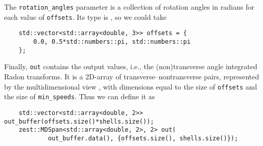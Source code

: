 \documentclass{article}
\begin{document}
The \texttt{rotation_angles} parameter is a collection of rotation angles in radians for each value of \texttt{offsets}. Its type is , so we could take
\begin{verbatim}
    std::vector<std::array<double, 3>> offsets = {
        0.0, 0.5*std::numbers::pi, std::numbers::pi
    };
\end{verbatim}

Finally, \texttt{out} contains the output values, i.e., the (non)transverse angle integrated Radon transforms. It is a 2D-array of transverse--nontransverse pairs, represented by the multidimensional view , with dimensions equal to the size of \texttt{offsets} and the size of \texttt{min\_speeds}. Thus we can define it as
\begin{verbatim}
    std::vector<std::array<double, 2>> out_buffer(offsets.size()*shells.size());
    zest::MDSpan<std::array<double, 2>, 2> out(
            out_buffer.data(), {offsets.size(), shells.size()});
\end{verbatim}
\end{document}
